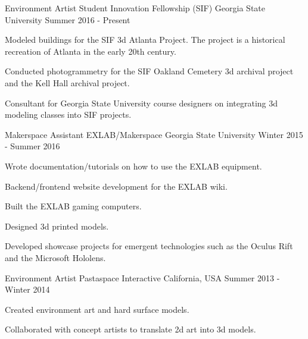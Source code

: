 

\begin{cventries}

  \cventry
    {Environment Artist} %
	{Student Innovation Fellowship (SIF)} %
    {Georgia State University} %
    {Summer 2016 - Present} %
    {
      \begin{cvitems} %
        \item {Modeled buildings for the SIF 3d Atlanta Project. The project is a historical recreation of Atlanta in the early 20th century.}
        \item {Conducted photogrammetry for the SIF Oakland Cemetery 3d archival project and the Kell Hall archival project.}
        \item {Consultant for Georgia State University course designers on integrating 3d modeling classes into SIF projects.}
      \end{cvitems}
    }

  \cventry
    {Makerspace Assistant} %
	{EXLAB/Makerspace} %
    {Georgia State University} %
    {Winter 2015 - Summer 2016} %
    {
      \begin{cvitems} %
        \item {Wrote documentation/tutorials on how to use the EXLAB equipment.}
        \item {Backend/frontend website development for the EXLAB wiki.}
		\item {Built the EXLAB gaming computers.}
		\item {Designed 3d printed models.}
		\item {Developed showcase projects for emergent technologies such as the Oculus Rift and the Microsoft Hololens.}
      \end{cvitems}
    }

  \cventry
	{Environment Artist} %
    {Pastaspace Interactive} %
    {California, USA} %
    {Summer 2013 - Winter 2014} %
    {
      \begin{cvitems} %
        \item {Created environment art and hard surface models.}
		\item {Collaborated with concept artists to translate 2d art into 3d models.}
      \end{cvitems}
    }
\end{cventries}


